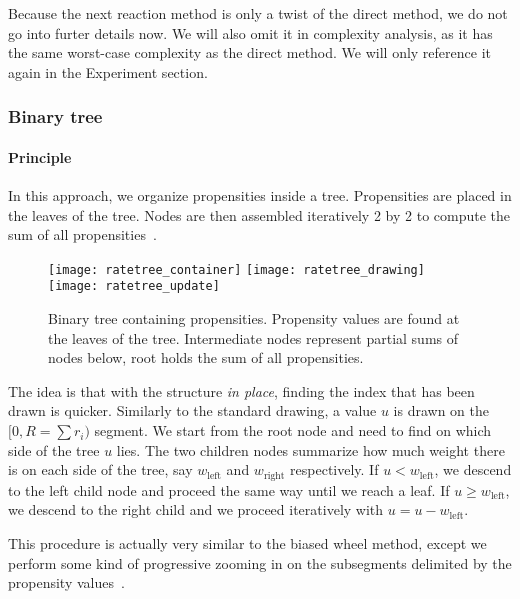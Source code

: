Because the next reaction method is only a twist of the direct method, we do not go into furter details now. We will also omit it in complexity analysis, as it has the same worst-case complexity as the direct method. We will only reference it again in the Experiment section.

\subsubsection {Binary tree}

\paragraph {Principle}

In this approach, we organize propensities inside a tree. Propensities are placed in the leaves of the tree. Nodes are then assembled iteratively 2 by 2 to compute the sum of all propensities~.

\begin{figure}[!h]
  \centering
  \begin{minipage}{0.8\textwidth}
    \texttt{[image: ratetree\_container]}
    \texttt{[image: ratetree\_drawing]}
    \texttt{[image: ratetree\_update]}
  \end{minipage}
  \caption {Binary tree containing propensities. Propensity values are found at the leaves of the tree. Intermediate nodes represent partial sums of nodes below, root holds the sum of all propensities.}
  \label {fig:binary_tree}
\end {figure}

The idea is that with the structure \emph{in place}, finding the index that has been drawn is quicker. Similarly to the standard drawing, a value $u$ is drawn on the $[0, R=\sum r_i)$ segment. We start from the root node and need to find on which side of the tree $u$ lies. The two children nodes summarize how much weight there is on each side of the tree, say $w_\textrm{left}$ and $w_\textrm{right}$ respectively. If $u < w_\textrm{left}$, we descend to the left child node and proceed the same way until we reach a leaf. If $u \geq w_\textrm{left}$, we descend to the right child and we proceed iteratively with $u = u - w_\textrm{left}$.

This procedure is actually very similar to the biased wheel method, except we perform some kind of progressive zooming in on the subsegments delimited by the propensity values~.

